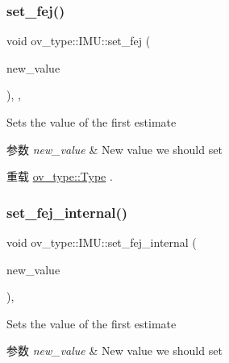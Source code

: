 \subsubsection{\texorpdfstring{set\+\_\+fej()}{set\_fej()}}
{\footnotesize\ttfamily void ov\+\_\+type\+::\+I\+M\+U\+::set\+\_\+fej (\begin{DoxyParamCaption}\item[{const Eigen\+::\+Matrix\+Xd \&}]{new\+\_\+value }\end{DoxyParamCaption})\hspace{0.3cm}{\ttfamily [inline]}, {\ttfamily [override]}, {\ttfamily [virtual]}}



Sets the value of the first estimate 


\begin{DoxyParams}{参数}
{\em new\+\_\+value} & New value we should set \\
\hline
\end{DoxyParams}


重载 \hyperlink{classov__type_1_1Type_ab8345946b27cb43e0cfc36454a06686d}{ov\+\_\+type\+::\+Type} .

\mbox{\label{classov__type_1_1IMU_a5227146c3f4edef484cb2c9beb349a3f}} 
\subsubsection{\texorpdfstring{set\+\_\+fej\+\_\+internal()}{set\_fej\_internal()}}
{\footnotesize\ttfamily void ov\+\_\+type\+::\+I\+M\+U\+::set\+\_\+fej\+\_\+internal (\begin{DoxyParamCaption}\item[{const Eigen\+::\+Matrix\+Xd \&}]{new\+\_\+value }\end{DoxyParamCaption})\hspace{0.3cm}{\ttfamily [inline]}, {\ttfamily [protected]}}



Sets the value of the first estimate 


\begin{DoxyParams}{参数}
{\em new\+\_\+value} & New value we should set \\
\hline
\end{DoxyParams}
\mbox{\label{classov__type_1_1IMU_a9d4e915d474e8e13591a11a54ac7c969}} 
